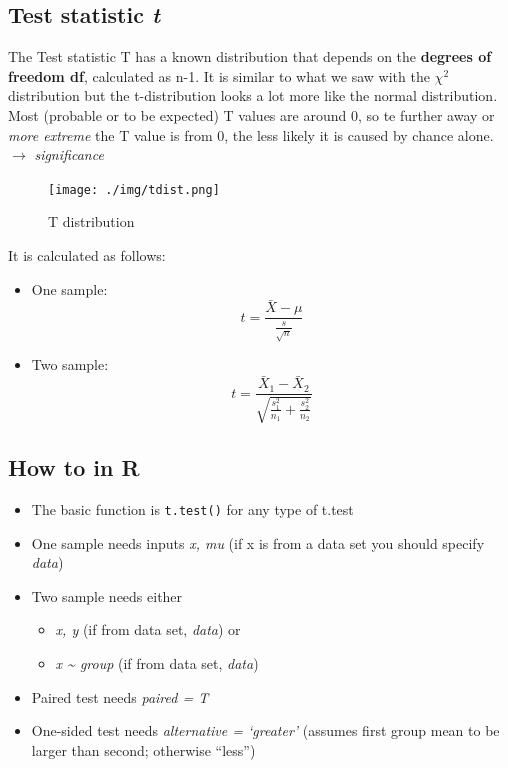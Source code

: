 \documentclass[
]{book}
\providecommand{\tightlist}{%
  \setlength{\itemsep}{0pt}\setlength{\parskip}{0pt}}
\begin{document}
\subsection{\texorpdfstring{Test statistic \emph{t}}{Test statistic t}}\label{test-statistic-t}

The Test statistic T has a known distribution that depends on the \textbf{degrees of freedom df}, calculated as n-1.
It is similar to what we saw with the \(\chi^2\) distribution but the t-distribution looks a lot more like the normal distribution.
Most (probable or to be expected) T values are around 0, so te further away or \emph{more extreme} the T value is from 0, the less likely it is caused by chance alone. \(\rightarrow\) \emph{significance}

\begin{figure}
\centering
\texttt{[image: ./img/tdist.png]}
\caption{T distribution}
\end{figure}

It is calculated as follows:

\begin{itemize}
\item
  One sample: \[ t = \frac{\bar{X} - \mu}{\frac{s}{\sqrt{n}}} \]
\item
  Two sample: \[t = \frac{\bar{X}_1 - \bar{X}_2}{\sqrt{\frac{s_1^2}{n_1} + \frac{s_2^2}{n_2}}} \]
\end{itemize}

\subsection{How to in R}\label{how-to-in-r-1}

\begin{itemize}
\tightlist
\item
  The basic function is \texttt{t.test()} for any type of t.test
\item
  One sample needs inputs \emph{x, mu} (if x is from a data set you should specify \emph{data})
\item
  Two sample needs either

  \begin{itemize}
  \tightlist
  \item
    \emph{x, y} (if from data set, \emph{data}) or
  \item
    \emph{x \textasciitilde{} group} (if from data set, \emph{data})
  \end{itemize}
\item
  Paired test needs \emph{paired = T}
\item
  One-sided test needs \emph{alternative = `greater'} (assumes first group mean to be larger than second; otherwise ``less'')
\end{itemize}
\end{document}

